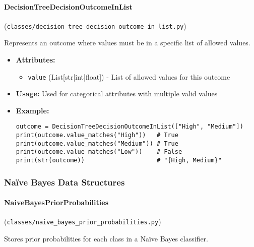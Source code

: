 \documentclass[
english,
smallborders
]{i6prcsht}
\begin{document}
\paragraph{DecisionTreeDecisionOutcomeInList} (\texttt{classes/decision\_tree\_decision\_outcome\_in\_list.py})

Represents an outcome where values must be in a specific list of allowed values.

\begin{itemize}
	\item \textbf{Attributes:}
	      \begin{itemize}
		      \item \texttt{value} (List[str|int|float]) - List of allowed values for this outcome
	      \end{itemize}
	\item \textbf{Usage:} Used for categorical attributes with multiple valid values
	\item \textbf{Example:}
	      \begin{lstlisting}
outcome = DecisionTreeDecisionOutcomeInList(["High", "Medium"])
print(outcome.value_matches("High"))   # True
print(outcome.value_matches("Medium")) # True
print(outcome.value_matches("Low"))    # False
print(str(outcome))                    # "{High, Medium}"
    \end{lstlisting}
\end{itemize}

\vspace*{0.3cm}

\vspace*{0.5cm}

\subsubsection*{Naïve Bayes Data Structures}

\paragraph{NaiveBayesPriorProbabilities} (\texttt{classes/naive\_bayes\_prior\_probabilities.py})

Stores prior probabilities for each class in a Naïve Bayes classifier.
\end{document}
